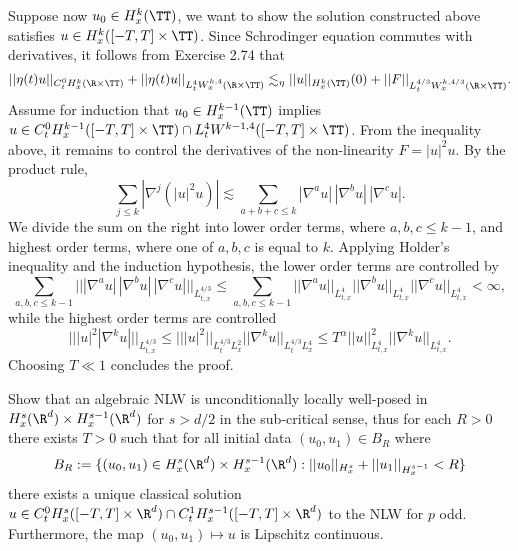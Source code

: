 \begin{solution}
	Suppose now $u_0 \in H^k_x (\TT)$, we want to show the solution constructed above satisfies $u \in H^k_x ([-T, T] \times \TT)$. Since Schrodinger equation commutes with derivatives, it follows from Exercise 2.74 that 
		\[ || \eta (t) u||_{C^0_t H^k_x (\R \times \TT)} + || \eta (t) u||_{L^4_t W^{k, 4}_{x} (\R \times \TT)} \lesssim_\eta ||u||_{H^k_x (\TT)}(0) + ||F||_{L^{4/3}_t W^{k, 4/3}_x (\R \times \TT)}. \]
	Assume for induction that $u_0 \in H^{k - 1}_x (\TT)$ implies $u \in C^0_t H^{k - 1}_x ([-T, T] \times \TT) \cap L^4_{t}W^{k - 1, 4} ([-T, T] \times \TT)$. From the inequality above, it remains to control the derivatives of the non-linearity $F = |u|^2 u$. By the product rule, 
		\[ \sum_{j \leq k} | \nabla^j (|u|^2 u)| \lesssim \sum_{a + b + c \leq k} |\nabla^a u| \, |\nabla^b u| \, |\nabla^c u|. \]	
	We divide the sum on the right into lower order terms, where $a, b, c \leq k - 1$, and highest order terms, where one of $a, b, c$ is equal to $k$. Applying Holder's inequality and the induction hypothesis, the lower order terms are controlled by
		\[ \sum_{a, b, c \leq k - 1} || |\nabla^a u| \, |\nabla^b u| \, |\nabla^c u| ||_{L^{4/3}_{t, x}} \leq  \sum_{a, b, c \leq k - 1} || \nabla^a u||_{L^4_{t, x}} || \nabla^b u||_{L^4_{t, x}} || \nabla^c u||_{L^4_{t, x}} < \infty,  \]	
	while the highest order terms are controlled
		\[ || |u|^2 |\nabla^k u| ||_{L^{4/3}_{t, x}} \leq |||u|^2||_{L^{4/3}_t L^2_{x}} || \nabla^k u||_{L^{4/3}_t L^4_x} \leq T^\alpha ||u||_{L^{4}_{t, x}}^2 ||\nabla^k u ||_{L^{4}_{t, x}} .\]
	Choosing $T \ll 1$ concludes the proof. 		
\end{solution}

\begin{statement}
	Show that an algebraic NLW is unconditionally locally well-posed in $H^s_x (\R^d) \times H^{s - 1}_x (\R^d)$ for $s > d/2$ in the sub-critical sense, thus for each $R > 0$ there exists $T > 0$ such that for all initial data $(u_0, u_1) \in B_R$ where
		\[ B_R := \{ (u_0, u_1) \in H^s_x (\R^d) \times H^{s - 1}_x (\R^d) : ||u_0||_{H^s_x} + ||u_1||_{H^{s - 1}_x} < R \}\]
	there exists a unique classical solution $u \in C^0_t H^s_x ([-T, T] \times \R^d) \cap C^1_t H^{s - 1}_x ([-T, T] \times \R^d)$ to the NLW for $p$ odd. Furthermore, the map $(u_0, u_1) \mapsto u$ is Lipschitz continuous. 
\end{statement}

